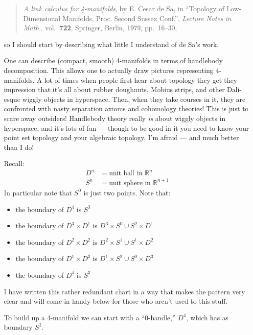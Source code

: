 \documentclass{article}
\def\tightlist{}
\begin{document}
\begin{quote}
\emph{A link calculus for 4-manifolds}, by E. Cesar de Sa, in ``Topology
of Low-Dimensional Manifolds, Proc. Second Sussex Conf.'', \emph{Lecture
Notes in Math.}, vol.~\textbf{722}, Springer, Berlin, 1979, pp.~16--30,
\end{quote}

so I should start by describing what little I understand of de Sa's
work.

One can describe (compact, smooth) 4-manifolds in terms of handlebody
decomposition. This allows one to actually draw pictures representing
4-manifolds. A lot of times when people first hear about topology they
get they impression that it's all about rubber doughnuts, Mobius strips,
and other Dali-esque wiggly objects in hyperspace. Then, when they take
courses in it, they are confronted with nasty separation axioms and
cohomology theories! This is just to scare away outsiders! Handlebody
theory really \emph{is} about wiggly objects in hyperspace, and it's
lots of fun --- though to be good in it you need to know your point set
topology and your algebraic topology, I'm afraid --- and much better
than I do!

Recall:
\[\begin{aligned}D^n &= \mbox{unit ball in $\mathbb{R}^n$} \\ S^n &= \mbox{unit sphere in $\mathbb{R}^{n+1}$}\end{aligned}\]
In particular note that \(S^0\) is just two points. Note that:

\begin{itemize}
\tightlist
\item
  the boundary of \(D^4\) is \(S^3\)
\item
  the boundary of \(D^3 \times D^1\) is
  \(D^3 \times S^0 \cup S^2 \times D^1\)
\item
  the boundary of \(D^2 \times D^2\) is
  \(D^2 \times S^1 \cup S^1 \times D^2\)
\item
  the boundary of \(D^1 \times D^3\) is
  \(D^1 \times S^2 \cup S^0 \times D^3\)
\item
  the boundary of \(D^4\) is \(S^3\)
\end{itemize}

I have written this rather redundant chart in a way that makes the
pattern very clear and will come in handy below for those who aren't
used to this stuff.

To build up a 4-manifold we can start with a ``0-handle,'' \(D^4\),
which has as boundary \(S^3\).
\end{document}
